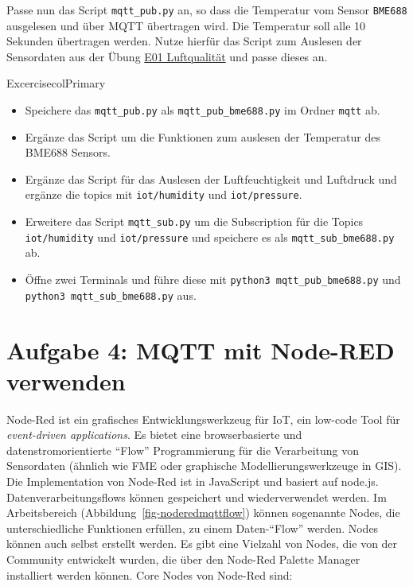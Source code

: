 \documentclass[
  11pt,
  a4paper,
  oneside, openany  ,captions=tableheading
]{scrbook}
\providecommand{\tightlist}{%
  \setlength{\itemsep}{0pt}\setlength{\parskip}{0pt}}
\theoremstyle{remark}
\renewcommand{\markright}[1]{\def\chaptertitle{#1}} %
\begin{document}
\markright{Aufgabe 3: Sensordaten mit MQTT übertragen}

Passe nun das Script \texttt{mqtt\_pub.py} an, so dass die Temperatur
vom Sensor \texttt{BME688} ausgelesen und über MQTT übertragen wird. Die
Temperatur soll alle 10 Sekunden übertragen werden. Nutze hierfür das
Script zum Auslesen der Sensordaten aus der Übung
\href{E01_Luftqualitaet.qmd}{E01 Luftqualität} und passe dieses an.

\begin{boxtitle}{Excercise}{colPrimary}

\begin{itemize}
\tightlist
\item
  Speichere das \texttt{mqtt\_pub.py} als \texttt{mqtt\_pub\_bme688.py}
  im Ordner \texttt{mqtt} ab.
\item
  Ergänze das Script um die Funktionen zum auslesen der Temperatur des
  BME688 Sensors.
\item
  Ergänze das Script für das Auslesen der Luftfeuchtigkeit und Luftdruck
  und ergänze die topics mit \texttt{iot/humidity} und
  \texttt{iot/pressure}.
\item
  Erweitere das Script \texttt{mqtt\_sub.py} um die Subscription für die
  Topics \texttt{iot/humidity} und \texttt{iot/pressure} und speichere
  es als \texttt{mqtt\_sub\_bme688.py} ab.
\item
  Öffne zwei Terminals und führe diese mit
  \texttt{python3\ mqtt\_pub\_bme688.py} und
  \texttt{python3\ mqtt\_sub\_bme688.py} aus.
\end{itemize}

\end{boxtitle}

\section*{Aufgabe 4: MQTT mit Node-RED
verwenden}\label{aufgabe-4-mqtt-mit-node-red-verwenden}

\markright{Aufgabe 4: MQTT mit Node-RED verwenden}

Node-Red ist ein grafisches Entwicklungswerkzeug für
IoT, ein low-code Tool für \emph{event-driven applications}. Es bietet
eine browserbasierte und datenstromorientierte ``Flow'' Programmierung
für die Verarbeitung von Sensordaten (ähnlich wie FME oder graphische
Modellierungswerkzeuge in GIS). Die Implementation von Node-Red ist in
JavaScript und basiert auf node.js. Datenverarbeitungsflows können
gespeichert und wiederverwendet werden. Im Arbeitsbereich
(Abbildung~\ref{fig-noderedmqttflow}) können sogenannte Nodes, die
unterschiedliche Funktionen erfüllen, zu einem Daten-``Flow'' werden.
Nodes können auch selbst erstellt werden. Es gibt eine Vielzahl von
Nodes, die von der Community entwickelt wurden, die über den Node-Red
Palette Manager installiert werden können. Core Nodes von Node-Red sind:
\end{document}
